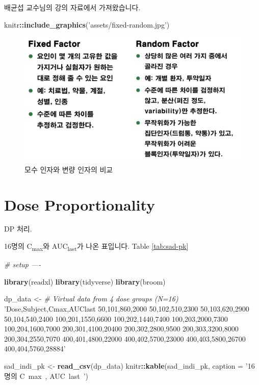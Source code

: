 \documentclass[12pt,]{krantz}
\newenvironment{Shaded}{\begin{snugshade}}{\end{snugshade}}
\newcommand{\KeywordTok}[1]{\textcolor[rgb]{0.13,0.29,0.53}{\textbf{#1}}}
\newcommand{\DataTypeTok}[1]{\textcolor[rgb]{0.13,0.29,0.53}{#1}}
\newcommand{\StringTok}[1]{\textcolor[rgb]{0.31,0.60,0.02}{#1}}
\newcommand{\CommentTok}[1]{\textcolor[rgb]{0.56,0.35,0.01}{\textit{#1}}}
\newcommand{\OperatorTok}[1]{\textcolor[rgb]{0.81,0.36,0.00}{\textbf{#1}}}
\newcommand{\NormalTok}[1]{#1}
\theoremstyle{definition}
\theoremstyle{definition}
\theoremstyle{definition}
\theoremstyle{remark}
\begin{document}
배균섭 교수님의 강의 자료에서 가져왔습니다.

\begin{Shaded}
\begin{Highlighting}[]
\NormalTok{knitr}\OperatorTok{::}\KeywordTok{include_graphics}\NormalTok{(}\StringTok{'assets/fixed-random.jpg'}\NormalTok{)}
\end{Highlighting}
\end{Shaded}

\begin{figure}
\includegraphics[width=1\linewidth]{assets/fixed-random} \caption{모수 인자와 변량 인자의 비교}\label{fig:fixedrandom}
\end{figure}

\section{Dose Proportionality}\label{dp}

DP 처리.

16명의 C\textsubscript{max}와 AUC\textsubscript{last}가 나온 표입니다.
Table \ref{tab:sad-pk}

\begin{Shaded}
\begin{Highlighting}[]
\CommentTok{# setup ----}

\KeywordTok{library}\NormalTok{(readxl)}
\KeywordTok{library}\NormalTok{(tidyverse)}
\KeywordTok{library}\NormalTok{(broom)}

\NormalTok{dp_data <-}\StringTok{ }\CommentTok{# Virtual data from 4 dose groups (N=16)}
\StringTok{'Dose,Subject,Cmax,AUClast}
\StringTok{50,101,860,2000}
\StringTok{50,102,510,2300}
\StringTok{50,103,620,2900}
\StringTok{50,104,540,2400}
\StringTok{100,201,1550,6600}
\StringTok{100,202,1440,7400}
\StringTok{100,203,2000,7300}
\StringTok{100,204,1600,7000}
\StringTok{200,301,4100,20400}
\StringTok{200,302,2800,9500}
\StringTok{200,303,3200,8000}
\StringTok{200,304,2550,7070}
\StringTok{400,401,4800,22000}
\StringTok{400,402,5700,23000}
\StringTok{400,403,5800,26700}
\StringTok{400,404,5760,28884'}

\NormalTok{sad_indi_pk <-}\StringTok{ }\KeywordTok{read_csv}\NormalTok{(dp_data)}
\NormalTok{knitr}\OperatorTok{::}\KeywordTok{kable}\NormalTok{(sad_indi_pk, }\DataTypeTok{caption =} \StringTok{'16명의 C~max~, AUC~last~'}\NormalTok{)}
\end{Highlighting}
\end{Shaded}
\end{document}
